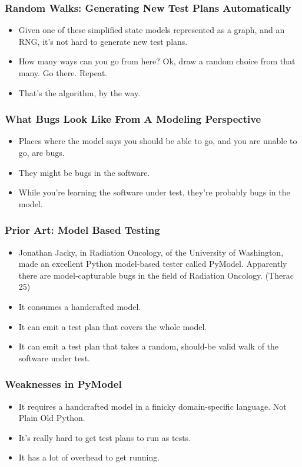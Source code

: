\begin{frame}
  \frametitle{Random Walks: Generating New Test Plans Automatically}
  \begin{itemize}
    \item Given one of these simplified state models represented as a graph, and an RNG, it's not hard to generate new test plans.
    \item How many ways can you go from here? Ok, draw a random choice from that many. Go there. Repeat.
    \item That's the algorithm, by the way.
  \end{itemize}
\end{frame}

\begin{frame}
  \frametitle{What Bugs Look Like From A Modeling Perspective}
  \begin{itemize}
    \item Places where the model says you should be able to go, and you are unable to go, are bugs.
    \item They might be bugs in the software.
    \item While you're learning the software under test, they're probably bugs in the model.
  \end{itemize}
\end{frame}

\begin{frame}
  \frametitle{Prior Art: Model Based Testing}
  \begin{itemize}
    \item Jonathan Jacky, in Radiation Oncology, of the University of Washington, made an excellent Python model-based tester called PyModel. Apparently there are model-capturable bugs in the field of Radiation Oncology. (Therac 25)
    \item It consumes a handcrafted model.
    \item It can emit a test plan that covers the whole model.
    \item It can emit a test plan that takes a random, should-be valid walk of the software under test.
  \end{itemize}
\end{frame}

\begin{frame}
  \frametitle{Weaknesses in PyModel}
  \begin{itemize}
    \item It requires a handcrafted model in a finicky domain-specific language. Not Plain Old Python.
    \item It's really hard to get test plans to run as tests.
    \item It has a lot of overhead to get running.
  \end{itemize}
\end{frame}

